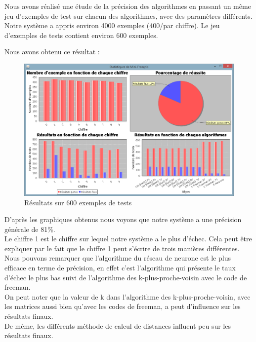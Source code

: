 \documentclass[10pt,a4paper]{report}
\begin{document}
\begin{flushleft}
Nous avons réalisé une étude de la précision des algorithmes en passant un même jeu d'exemples de test sur chacun des algorithmes, avec des paramètres différents.
Notre système a appris environ 4000 exemples (400/par chiffre).
Le jeu d'exemples de tests contient environ 600 exemples.\newline \newline

Nous avons obtenu ce résultat :
\begin{figure}[!h]
	\center
		\includegraphics[scale=0.5]{./Ressource/Statistiques.png}
 	\caption{Résultats sur 600 exemples de tests}
\end{figure}


D'après les graphiques obtenus nous voyons que notre système a une précision générale de 81\%.\\
Le chiffre 1 est le chiffre sur lequel notre système a le plus d'échec. Cela peut être expliquer par le fait que le chiffre 1 peut s'écrire de trois manières différentes.\\
Nous pouvons remarquer que l'algorithme du réseau de neurone est le plus efficace en terme de précision, en effet c'est l'algorithme qui présente le taux d'échec le plus bas suivi de l'algorithme des k-plus-proche-voisin avec le code de freeman.\\
On peut noter que la valeur de k dans l'algorithme des k-plus-proche-voisin, avec les matrices aussi bien qu'avec les codes de freeman, a peut d'influence sur les résultats finaux.\\
De même, les différents méthode de calcul de distances influent peu sur les résultats finaux.

\end{flushleft}
\end{document}
